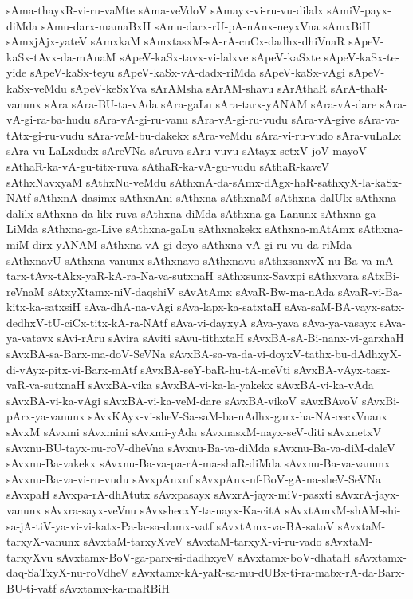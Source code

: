 {sAma-thayxR-vi-ru-vaMte
sAma-veVdoV
sAmayx-vi-ru-vu-dilalx
sAmiV-payx-diMda
sAmu-darx-mamaBxH
sAmu-darx-rU-pA-nAnx-neyxVna
sAmxBiH
sAmxjAjx-yateV
sAmxkaM
sAmxtasxM-sA-rA-cuCx-dadhx-dhiVnaR
sApeV-kaSx-tAvx-da-mAnaM
sApeV-kaSx-tavx-vi-lalxve
sApeV-kaSxte
sApeV-kaSx-te-yide
sApeV-kaSx-teyu
sApeV-kaSx-vA-dadx-riMda
sApeV-kaSx-vAgi
sApeV-kaSx-veMdu
sApeV-keSxYva
sArAMsha
sArAM-shavu
sArAthaR
sArA-thaR-vanunx
sAra
sAra-BU-ta-vAda
sAra-gaLu
sAra-tarx-yANAM
sAra-vA-dare
sAra-vA-gi-ra-ba-hudu
sAra-vA-gi-ru-vanu
sAra-vA-gi-ru-vudu
sAra-vA-give
sAra-va-tAtx-gi-ru-vudu
sAra-veM-bu-dakekx
sAra-veMdu
sAra-vi-ru-vudo
sAra-vuLaLx
sAra-vu-LaLxdudx
sAreVNa
sAruva
sAru-vuvu
sAtayx-setxV-joV-mayoV
sAthaR-ka-vA-gu-titx-ruva
sAthaR-ka-vA-gu-vudu
sAthaR-kaveV
sAthxNavxyaM
sAthxNu-veMdu
sAthxnA-da-sAmx-dAgx-haR-sathxyX-la-kaSx-NAtf
sAthxnA-dasimx
sAthxnAni
sAthxna
sAthxnaM
sAthxna-dalUlx
sAthxna-dalilx
sAthxna-da-lilx-ruva
sAthxna-diMda
sAthxna-ga-Lanunx
sAthxna-ga-LiMda
sAthxna-ga-Live
sAthxna-gaLu
sAthxnakekx
sAthxna-mAtAmx
sAthxna-miM-dirx-yANAM
sAthxna-vA-gi-deyo
sAthxna-vA-gi-ru-vu-da-riMda
sAthxnavU
sAthxna-vanunx
sAthxnavo
sAthxnavu
sAthxsanxvX-nu-Ba-va-mA-tarx-tAvx-tAkx-yaR-kA-ra-Na-va-sutxnaH
sAthxsunx-Savxpi
sAthxvara
sAtxBi-reVnaM
sAtxyXtamx-niV-daqshiV
sAvAtAmx
sAvaR-Bw-ma-nAda
sAvaR-vi-Ba-kitx-ka-satxsiH
sAva-dhA-na-vAgi
sAva-lapx-ka-satxtaH
sAva-saM-BA-vayx-satx-dedhxV-tU-ciCx-titx-kA-ra-NAtf
sAva-vi-dayxyA
sAva-yava
sAva-ya-vasayx
sAva-ya-vatavx
sAvi-rAru
sAvira
sAviti
sAvu-tithxtaH
sAvxBA-sA-Bi-nanx-vi-garxhaH
sAvxBA-sa-Barx-ma-doV-SeVNa
sAvxBA-sa-va-da-vi-doyxV-tathx-bu-dAdhxyX-di-vAyx-pitx-vi-Barx-mAtf
sAvxBA-seY-baR-hu-tA-meVti
sAvxBA-vAyx-tasx-vaR-va-sutxnaH
sAvxBA-vika
sAvxBA-vi-ka-la-yakekx
sAvxBA-vi-ka-vAda
sAvxBA-vi-ka-vAgi
sAvxBA-vi-ka-veM-dare
sAvxBA-vikoV
sAvxBAvoV
sAvxBi-pArx-ya-vanunx
sAvxKAyx-vi-sheV-Sa-saM-ba-nAdhx-garx-ha-NA-cecxVnanx
sAvxM
sAvxmi
sAvxmini
sAvxmi-yAda
sAvxnasxM-nayx-seV-diti
sAvxnetxV
sAvxnu-BU-tayx-nu-roV-dheVna
sAvxnu-Ba-va-diMda
sAvxnu-Ba-va-diM-daleV
sAvxnu-Ba-vakekx
sAvxnu-Ba-va-pa-rA-ma-shaR-diMda
sAvxnu-Ba-va-vanunx
sAvxnu-Ba-va-vi-ru-vudu
sAvxpAnxnf
sAvxpAnx-nf-BoV-gA-na-sheV-SeVNa
sAvxpaH
sAvxpa-rA-dhAtutx
sAvxpasayx
sAvxrA-jayx-miV-pasxti
sAvxrA-jayx-vanunx
sAvxra-sayx-veVnu
sAvxshecxY-ta-nayx-Ka-citA
sAvxtAmxM-shAM-shi-sa-jA-tiV-ya-vi-vi-katx-Pa-la-sa-damx-vatf
sAvxtAmx-va-BA-satoV
sAvxtaM-tarxyX-vanunx
sAvxtaM-tarxyXveV
sAvxtaM-tarxyX-vi-ru-vado
sAvxtaM-tarxyXvu
sAvxtamx-BoV-ga-parx-si-dadhxyeV
sAvxtamx-boV-dhataH
sAvxtamx-daq-SaTxyX-nu-roVdheV
sAvxtamx-kA-yaR-sa-mu-dUBx-ti-ra-mabx-rA-da-Barx-BU-ti-vatf
sAvxtamx-ka-maRBiH
}

